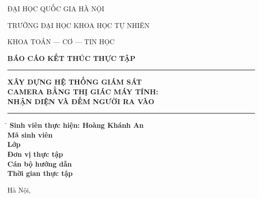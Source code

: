 \begin{titlepage}
\centering
\thispagestyle{empty}

{\large ĐẠI HỌC QUỐC GIA HÀ NỘI\par}
{\large TRƯỜNG ĐẠI HỌC KHOA HỌC TỰ NHIÊN\par}
{\large KHOA TOÁN --- CƠ --- TIN HỌC\par}

\vspace{1.2cm}


\vspace{1.8cm}

{\Large\bfseries BÁO CÁO KẾT THÚC THỰC TẬP\par}

\vspace{1.5cm}

\rule{0.8\textwidth}{0.4pt}\par
\vspace{0.7cm}
{\LARGE\bfseries XÂY DỰNG HỆ THỐNG GIÁM SÁT\\[0.3cm]
CAMERA BẰNG THỊ GIÁC MÁY TÍNH:\\[0.3cm]
NHẬN DIỆN VÀ ĐẾM NGƯỜI RA VÀO\par}
\vspace{0.7cm}
\rule{0.8\textwidth}{0.4pt}\par

\vspace{2.2cm}

\begin{minipage}{0.92\textwidth}
\large
\begin{tabbing}
\hspace{4.5cm}\= \kill
\textbf{Sinh viên thực hiện: Hoàng Khánh An} \>  \\[0.35cm]
\textbf{Mã sinh viên} \>  \\[0.35cm]
\textbf{Lớp} \>  \\[0.35cm]
\textbf{Đơn vị thực tập} \>  \\[0.35cm]
\textbf{Cán bộ hướng dẫn} \>  \\[0.35cm]
\textbf{Thời gian thực tập} \> 
\end{tabbing}
\end{minipage}

\vfill
{\large Hà Nội, \par}

\end{titlepage}
